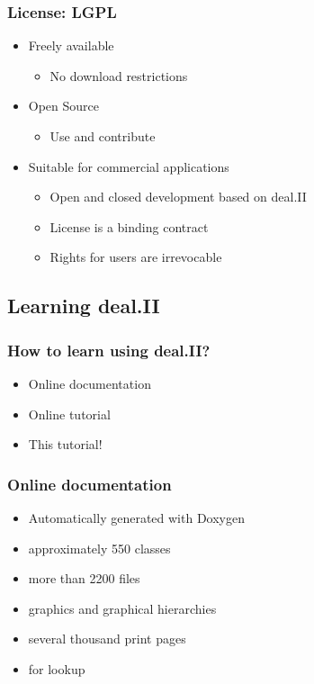 \begin{frame}
  \frametitle{License: LGPL}
  \begin{itemize}
  \item Freely available
    \begin{itemize}
    \item No download restrictions
    \end{itemize}
  \item Open Source
    \begin{itemize}
    \item Use and contribute
    \end{itemize}
  \item Suitable for commercial applications
    \begin{itemize}
    \item Open and closed development based on deal.II
    \item License is a binding contract
    \item Rights for users are irrevocable
    \end{itemize}
  \end{itemize}
\end{frame}

\subsection{Learning deal.II}

\begin{frame}
  \frametitle{How to learn using deal.II?}
  \begin{itemize}
  \item Online documentation
  \item Online tutorial
  \item This tutorial!
  \end{itemize}
\end{frame}

\begin{frame}
  \frametitle{Online documentation}
  \begin{itemize}
  \item Automatically generated with Doxygen
  \item approximately 550 classes
  \item more than 2200 files
  \item graphics and graphical hierarchies
  \item several thousand print pages
  \item {} for lookup
  \end{itemize}
\end{frame}

